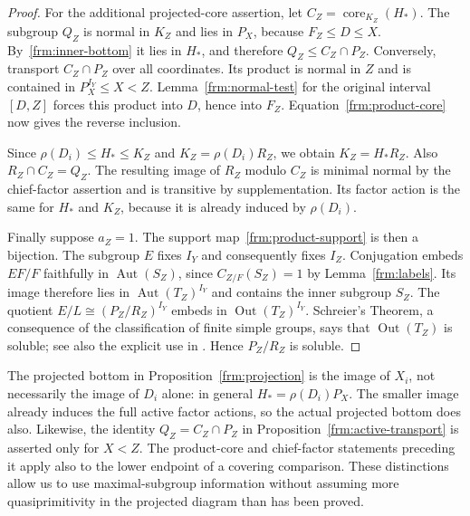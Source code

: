 \begin{proof}
For the additional projected-core assertion, let
$C_Z=\operatorname{core}_{K_Z}(H_*)$. The subgroup $Q_Z$ is normal
in $K_Z$ and lies in $P_X$, because $F_Z\le D\le X$.
By~\eqref{frm:inner-bottom} it lies in $H_*$, and therefore
$Q_Z\le C_Z\cap P_Z$. Conversely, transport $C_Z\cap P_Z$ over all
coordinates. Its product is normal in $Z$ and is contained in
$P_X^{I_Y}\le X<Z$. Lemma~\ref{frm:normal-test} for the original
interval $[D,Z]$ forces this product into $D$, hence into $F_Z$.
Equation~\eqref{frm:product-core} now gives the reverse inclusion.

Since $\rho(D_i)\le H_*\le K_Z$ and
$K_Z=\rho(D_i)R_Z$, we obtain $K_Z=H_*R_Z$. Also
$R_Z\cap C_Z=Q_Z$. The resulting image of $R_Z$ modulo $C_Z$ is
minimal normal by the chief-factor assertion and is transitive by
supplementation. Its factor action is the same for $H_*$ and $K_Z$,
because it is already induced by $\rho(D_i)$.

Finally suppose $a_Z=1$. The support map~\eqref{frm:product-support}
is then a bijection. The subgroup $E$ fixes $I_Y$ and consequently fixes
$I_Z$. Conjugation embeds $EF/F$ faithfully in
$\operatorname{Aut}(S_Z)$, since $C_{Z/F}(S_Z)=1$ by
Lemma~\ref{frm:labels}. Its image therefore lies in
$\operatorname{Aut}(T_Z)^{I_Y}$ and contains the inner subgroup
$S_Z$. The quotient $E/L\cong(P_Z/R_Z)^{I_Y}$ embeds in
$\operatorname{Out}(T_Z)^{I_Y}$. Schreier's Theorem, a consequence
of the classification of finite simple groups, says that
$\operatorname{Out}(T_Z)$ is soluble; see also the explicit use in
\cite[Section~1]{PalfyTwisted}. Hence $P_Z/R_Z$ is soluble.
\end{proof}

\begin{remark}
The projected bottom in Proposition~\ref{frm:projection} is the image
of $X_i$, not necessarily the image of $D_i$ alone: in general
$H_* = \rho(D_i)P_X$. The smaller image already induces the full
active factor actions, so the actual projected bottom does also.
Likewise, the identity $Q_Z=C_Z\cap P_Z$ in
Proposition~\ref{frm:active-transport} is asserted only for $X<Z$.
The product-core and chief-factor statements preceding it apply also
to the lower endpoint of a covering comparison. These distinctions
allow us to use maximal-subgroup information without assuming more
quasiprimitivity in the projected diagram than has been proved.
\end{remark}

